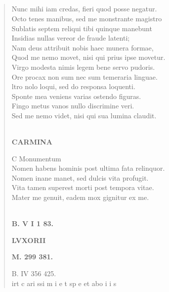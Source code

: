 \documentclass[11pt, a4paper]{report}
\begin{document}
            \subsection*{}
      \begin{verse}
       \lbrack Nunc mihi iam credas, fieri quod posse negatur. \\ Octo tenes manibus, sed me monstrante magistro \\ Sublatis septem reliqui tibi quinque manebunt \rbrack  \\ Insidias nullas vereor de fraude latenti; \\ Nam deus attribuit nobis haec munera formae, \\ Quod me nemo movet, nisi qui prius ipse movetur. \\ Virgo modesta nimis legem bene servo pudoris. \\ Ore procax non sum nec sum temeraria linguae. \\ ltro nolo loqui, sed do responsa loquenti. \\ Sponte mea veniens varias ostendo figuras. \\ Fingo metus vanos nullo discrimine veri. \\ Sed me nemo videt, nisi qui sua lumina claudit. \\ 
        ﻿\pagebreak 
    \begin{center} \textbf{CARMINA} \end{center} \marginpar{[246]} C Monumentum \\ Nomen habens hominis post ultima fata relinquor. \\ Nomen inane manet, sed dulcis vita profugit. \\ Vita tamen superest morti post tempora vitae. \\ Mater me genuit, eadem mox gignitur ex me. \\ 
        ﻿\pagebreak 
    \begin{center} \textbf{B. V I 1 83.} \end{center}\begin{center} \textbf{LVXORII} \end{center}\begin{center} \textbf{M. 299 381.} \end{center}B. IV 356 425. \\ irt c ari ssi m i e t sp e et abo i i s \\ 
      \end{verse}
  
\end{document}
